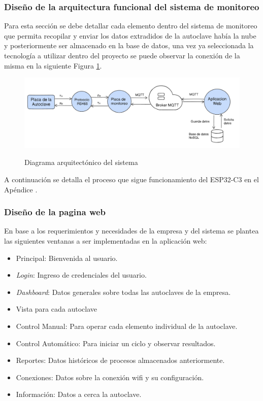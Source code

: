 \subsubsection{Diseño de la arquitectura funcional del sistema de monitoreo}
Para esta sección se debe detallar cada elemento dentro del sistema de monitoreo que permita recopilar y enviar los datos extradidos de la autoclave había la nube y posteriormente ser almacenado en la base de datos, una vez ya seleccionada la tecnología a utilizar dentro del proyecto se puede observar la conexión de la misma en la siguiente Figura \ref{fig:arqui}.
\begin{figure}[!htb]
    \centering
    \caption{Diagrama arquitectónico del sistema} %
    {\includegraphics[width=1\columnwidth]{Figuras/arqui.png}}\\
    \label{fig:arqui}
\end{figure}

A continuación se detalla el proceso que sigue funcionamiento del ESP32-C3 en el Apéndice .

\subsubsection{Diseño de la pagina web}
En base a los requerimientos y necesidades de la empresa y del sistema se plantea las siguientes ventanas a ser implementadas en la aplicación web: 
\begin{itemize}
    \item Principal: Bienvenida al usuario.
    \item \textit{Login}: Ingreso de credenciales del usuario.
    \item \textit{Dashboard}: Datos generales sobre todas las autoclaves de la empresa.
    \item Vista para cada autoclave
    \item Control Manual: Para operar cada elemento individual de la autoclave.
    \item Control Automático: Para iniciar un ciclo y observar resultados.
    \item Reportes: Datos históricos de procesos almacenados anteriormente.
    \item Conexiones: Datos sobre la conexión \acrshort{wifi} y su configuración.
    \item Información: Datos a cerca la autoclave.
\end{itemize}


